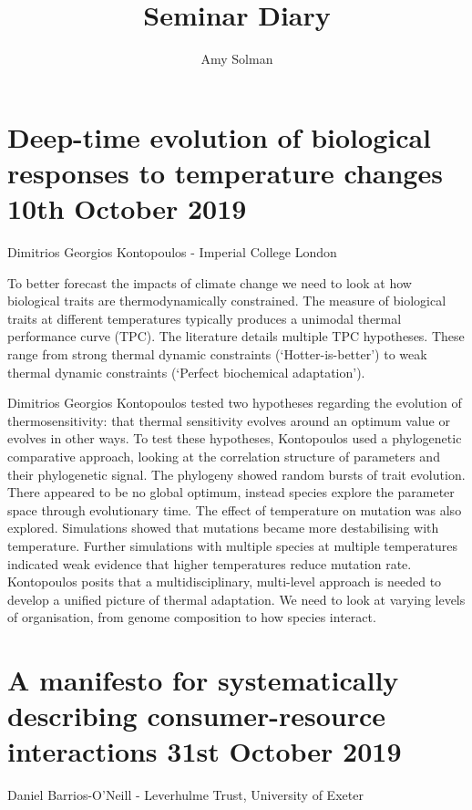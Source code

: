 \documentclass{article}
\begin{document}
\title{Seminar Diary{}}
\author{Amy Solman}

\maketitle

\section{Deep-time evolution of biological responses to temperature changes 10th October 2019 }

Dimitrios Georgios Kontopoulos - Imperial College London \bigskip

\noindent To better forecast the impacts of climate change we need to look at how biological traits are thermodynamically constrained. The measure of biological traits at different temperatures typically produces a unimodal thermal performance curve (TPC).  The literature details multiple TPC hypotheses. These range from strong thermal dynamic constraints (‘Hotter-is-better’) to weak thermal dynamic constraints (‘Perfect biochemical adaptation’). \bigskip

\noindent Dimitrios Georgios Kontopoulos tested two hypotheses regarding the evolution of thermosensitivity: that thermal sensitivity evolves around an optimum value or evolves in other ways. To test these hypotheses, Kontopoulos used a phylogenetic comparative approach, looking at the correlation structure of parameters and their phylogenetic signal. The phylogeny showed random bursts of trait evolution. There appeared to be no global optimum, instead species explore the parameter space through evolutionary time. The effect of temperature on mutation was also explored. Simulations showed that mutations became more destabilising with temperature. Further simulations with multiple species at multiple temperatures indicated weak evidence that higher temperatures reduce mutation rate. Kontopoulos posits that a multidisciplinary, multi-level approach is needed to develop a unified picture of thermal adaptation. We need to look at varying levels of organisation, from genome composition to how species interact.

\section{A manifesto for systematically describing consumer-resource interactions 31st October 2019}

Daniel Barrios-O’Neill - Leverhulme Trust, University of Exeter  \bigskip
\end{document}
